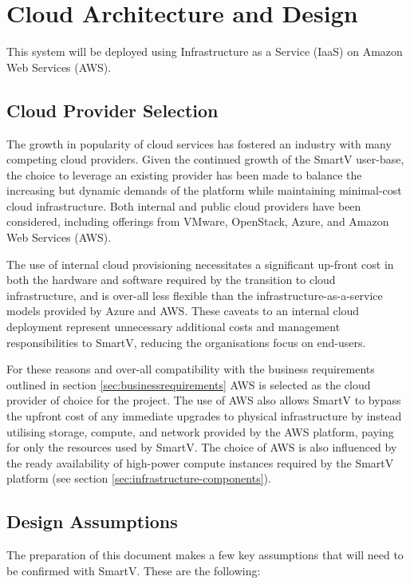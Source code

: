 \section{Cloud Architecture and Design}

This system will be deployed using Infrastructure as a Service (IaaS) on Amazon Web Services (AWS).

\subsection{Cloud Provider Selection}
The growth in popularity of cloud services has fostered an industry with many competing cloud providers. Given the continued growth of the SmartV user-base, the choice to leverage an existing provider has been made to balance the increasing but dynamic demands of the platform while maintaining minimal-cost cloud infrastructure. Both internal and public cloud providers have been considered, including offerings from VMware, OpenStack, Azure, and Amazon Web Services (AWS).

The use of internal cloud provisioning necessitates a significant up-front cost in both the hardware and software required by the transition to cloud infrastructure, and is over-all less flexible than the infrastructure-as-a-service models provided by Azure and AWS. These caveats to an internal cloud deployment represent unnecessary additional costs and management responsibilities to SmartV, reducing the organisations focus on end-users.

For these reasons and over-all compatibility with the business requirements outlined in section \ref{sec:businessrequirements} AWS is selected as the cloud provider of choice for the project. The use of AWS also allows SmartV to bypass the upfront cost of any immediate upgrades to physical infrastructure by instead utilising storage, compute, and network provided by the AWS platform, paying for only the resources used by SmartV. The choice of AWS is also influenced by the ready availability of high-power compute instances required by the SmartV platform (see section \ref{sec:infrastructure-components}).

\subsection{Design Assumptions}

The preparation of this document makes a few key assumptions that will need to be confirmed with SmartV. These are the following: 

